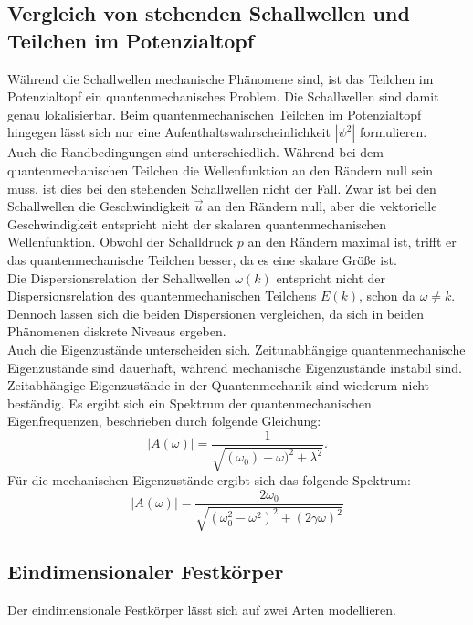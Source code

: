 \subsection{Vergleich von stehenden Schallwellen und Teilchen im Potenzialtopf}
Während die Schallwellen mechanische Phänomene sind, ist das Teilchen im Potenzialtopf ein quantenmechanisches Problem.
Die Schallwellen sind damit genau lokalisierbar.
Beim quantenmechanischen Teilchen im Potenzialtopf hingegen lässt sich nur eine Aufenthaltswahrscheinlichkeit $|\psi^2|$ formulieren.\\
Auch die Randbedingungen sind unterschiedlich.
Während bei dem quantenmechanischen Teilchen die Wellenfunktion an den Rändern null sein muss, ist dies bei den stehenden Schallwellen nicht der Fall.
Zwar ist bei den Schallwellen die Geschwindigkeit $\vec{u}$ an den Rändern null, aber die vektorielle Geschwindigkeit entspricht nicht der skalaren quantenmechanischen Wellenfunktion.
Obwohl der Schalldruck $p$ an den Rändern maximal ist, trifft er das quantenmechanische Teilchen besser, da es eine skalare Größe ist.\\
Die Dispersionsrelation der Schallwellen $\omega(k)$ entspricht nicht der Dispersionsrelation des quantenmechanischen Teilchens $E(k)$, schon da $\omega ≠ k$.
Dennoch lassen sich die beiden Dispersionen vergleichen, da sich in beiden Phänomenen diskrete Niveaus ergeben.\\
Auch die Eigenzustände unterscheiden sich.
Zeitunabhängige quantenmechanische Eigenzustände sind dauerhaft, während mechanische Eigenzustände instabil sind.
Zeitabhängige Eigenzustände in der Quantenmechanik sind wiederum nicht beständig.
Es ergibt sich ein Spektrum der quantenmechanischen Eigenfrequenzen, beschrieben durch folgende Gleichung:
\begin{equation}
  |A(\omega)| = \frac{ 1 }{ \sqrt{ (\omega_{0}) - \omega)^2 + \lambda^2} }.
  \label{eqn:spektrumqm}
\end{equation}
Für die mechanischen Eigenzustände ergibt sich das folgende Spektrum:
\begin{equation}
  |A(\omega)| = \frac{ 2 \omega_{0} }{ \sqrt{ (\omega_{0}^2 - \omega^2)^2 + (2 \gamma \omega)^2 } }
  \label{eqn:spektrumschall}
\end{equation}
%
\subsection{Eindimensionaler Festkörper}
Der eindimensionale Festkörper lässt sich auf zwei Arten modellieren.

